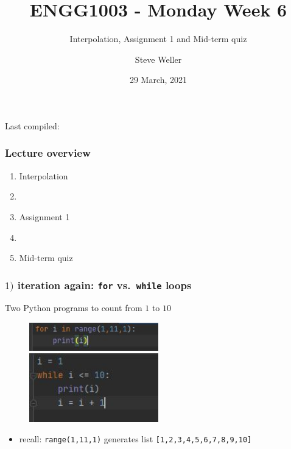 \documentclass[english,14pt]{beamer}
\title{ENGG1003 - Monday Week 6}
\subtitle{Interpolation, Assignment 1 and Mid-term quiz}
\author{Steve Weller}
\institute{University of Newcastle}
\date{29 March, 2021}
\begin{document}
\begin{flushleft}
{\scriptsize Last compiled:~\DTMnow}
\vspace*{-5mm}
\end{flushleft}
\framebreak


\begin{frame}[fragile]

\frametitle{Lecture overview}
\begin{enumerate}
	\item Interpolation
	\item[]
	
	\item Assignment 1
	
	\item[]
	
	\item Mid-term quiz

\end{enumerate}

\end{frame}


\begin{frame}[fragile]

\frametitle{$1)$ iteration again: \texttt{for} vs.~\texttt{while} loops}

Two Python programs to count from $1$ to $10$

\begin{figure}[ht]
	\centering
	\includegraphics[width=0.5\textwidth]{figures/for1to10}%
	\hspace*{3mm}\includegraphics[width=0.5\textwidth]{figures/while1to10}
\end{figure}

\begin{itemize}
	\item recall: \texttt{range(1,11,1)} generates list \texttt{[1,2,3,4,5,6,7,8,9,10]} 
\end{itemize}

\end{frame}
\end{document}
